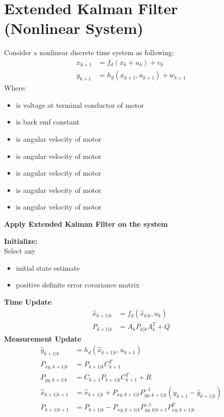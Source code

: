 \documentclass[12pt,a4paper]{article}
\begin{document}
	\section{Extended Kalman Filter (Nonlinear System)}
	Consider a nonlinear discrete time system as following:
	\begin{equation}
		\begin{split}
			x_{k+1} &= f_d(x_k+u_k) + v_k \\
			y_{k+1} &= h_d(x_{k+1},u_{k+1}) + w_{k+1}
		\end{split}
		\label{eq5}
	\end{equation}
	Where:
	\begin{itemize}
		\item { is voltage at terminal conductor of motor }
		\item { is back emf constant}
		\item { is angular velocity of motor}
		\item { is angular velocity of motor}
		\item { is angular velocity of motor}
		\item { is angular velocity of motor}
		\item { is angular velocity of motor}
	\end{itemize}
	\begin{center}
		\textbf{Apply Extended Kalman Filter on the system}
	\end{center}
	\textbf{Initialize:}\\
	Select any
	\begin{itemize}
		\item { initial state estimate}
		\item { positive definite error covariance matrix}
	\end{itemize}
	\textbf{Time Update}
	\begin{equation}
		\begin{split}
			\hat{x}_{k+1|k} &= f_d(\hat{x}_{k|k},u_k) \\
			P_{k+1|k} &= A_kP_{k|k}A^T_k+Q
		\end{split}
		\label{eq6}
	\end{equation}
	\textbf{Measurement Update}
	\begin{equation}
		\begin{split}
			\hat{y}_{k+1|k} &= h_d(\hat{x}_{k+1|k},u_{k+1})\\
			P_{xy,k+1|k}    &= P_{k+1|k}C^T_{k+1}\\
			P_{yy,k+1|k}    &= C_{k+1}P_{k+1|k}C^T_{k+1}+R\\
			\hat{x}_{k+1|k+1} &= \hat{x}_{k+1|k} + P_{xy,k+1|k}P^{-1}_{yy,k+1|k}(y_{k+1}-\hat{y}_{k+1|k})\\
			P_{k+1|k+1}     &= P_{k+1|k} - P_{xy,k+1|k}P^{-1}_{yy,k|k+1}P^T_{xy,k+1|k} 
		\end{split}
		\label{eq7}
	\end{equation}
\end{document}
